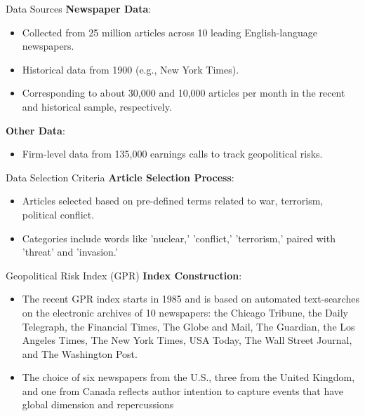 \documentclass[11pt]{beamer}
\begin{document}
\begin{frame}{Data Sources}
\textbf{Newspaper Data}:

	\begin{itemize}
		\item Collected from 25 million articles across 10 leading English-language newspapers.

		\item Historical data from 1900 (e.g., New York Times).

		\item Corresponding to about 30,000 and 10,000 articles per month in the recent and historical sample, respectively.

	\end{itemize}
\textbf{Other Data}:

	\begin{itemize}
		\item Firm-level data from 135,000 earnings calls to track geopolitical risks.
	\end{itemize}
\end{frame}
\begin{frame}{Data Selection Criteria}
\textbf{Article Selection Process}:

	\begin{itemize}
		\item Articles selected based on pre-defined terms related to war, terrorism, political conflict.

		\item Categories include words like 'nuclear,' 'conflict,' 'terrorism,' paired with 'threat' and 'invasion.'
	\end{itemize}
\end{frame}
\begin{frame}{Geopolitical Risk Index (GPR)}
\textbf{Index Construction}:

	\begin{itemize}
		\item The recent GPR index starts in 1985 and is based on automated text-searches on the electronic archives of 10 newspapers: the Chicago Tribune, the Daily Telegraph, the Financial Times, The Globe and Mail, The Guardian, the Los Angeles Times, The New York Times, USA Today, The Wall Street Journal, and The Washington Post. 

		\item The choice of six newspapers from the U.S., three from the United Kingdom, and one from Canada reflects author intention to capture events that have global dimension and repercussions
	\end{itemize}
\end{frame}
\end{document}
